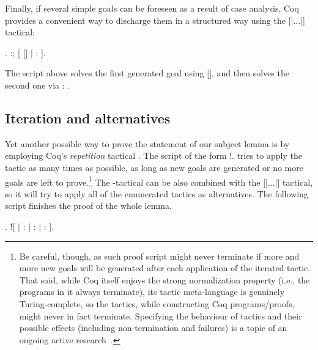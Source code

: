 Finally, if several simple goals can be foreseen as a result of case
analysis, Coq provides a convenient way to discharge them in a
structured way using \ssrtl{[|...|]} the [|...|] tactical:


\begin{coqdoccode}
\coqdocemptyline
\coqdocnoindent
{}.\coqdoceol
\coqdocnoindent
{}:; [ [] \ensuremath{|}  : ].\coqdoceol
\coqdocemptyline
\end{coqdoccode}


The script above solves the first generated goal using  [], and
then solves the second one via  : .






\subsection{Iteration and alternatives}




Yet another possible way to prove the statement of our subject lemma
is by employing Coq's \textit{repetition} tactical . The
script of the form  !. tries to apply the tactic  as many
times as possible, as long as new goals are generated or no more goals
are left to prove.\footnote{Be careful, though, as such proof script
might never terminate if more and more new goals will be generated
after each application of the iterated tactic. That said, while Coq
itself enjoys the strong normalization property (i.e., the programs in
it always  terminate), its tactic
meta-language is genuinely Turing-complete, so the tactics, while
constructing Coq programs/proofs, might never in fact
terminate. Specifying the behaviour of tactics and their possible
effects (including non-termination and failures) is a topic of an
ongoing active
research~\cite{Ziliani-al:ICFP13,Stampoulis-Shao:ICFP10}.} The
-tactical can be also combined with the [|...|] tactical, so it
will try to apply all of the enumerated tactics as alternatives. The
following script finishes the proof of the whole lemma.


\begin{coqdoccode}
\coqdocemptyline
\coqdocnoindent
{}.\coqdoceol
\coqdocnoindent
{}  ![ \ensuremath{|} :  \ensuremath{|} :  \ensuremath{|} : ].\coqdoceol
\coqdocemptyline
\end{coqdoccode}


